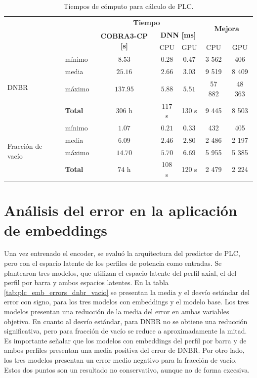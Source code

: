 \begin{table}[H]
	\centering
	\caption{Tiempos de cómputo para cálculo de PLC.}
	\begin{tabular}{l l c c c c c} 
        \toprule
        & & \multicolumn{3}{c}{\textbf{Tiempo}} & \multicolumn{2}{c}{\multirow{2}{*}{\textbf{Mejora}}} \\
        & & \multirow{2}{*}{\textbf{COBRA3-CP [s]}} & \multicolumn{2}{c}{\textbf{DNN [ms]}} &  \\
        & &                                     & CPU & GPU & CPU & GPU \\
        \hline
        \multirow{4}{1.5cm}{DNBR}   
                                & mínimo        & $8.53$      & $0.28$  & $0.47$ & 3 562   & 406 \\
                                & media         & $25.16$     & $2.66$  & $3.03$ & 9 519   & 8 409\\
                                & máximo        & $137.95$    & $5.88$  & $5.51$ & 57 882 & 48 363\\
                                & \textbf{Total}& 306 h     & 117 s & 130 s& 9 445  & 8 503\\
        \hline
        \multirow{4}{1.5cm}{Fracción de vacío}  
                                & mínimo        & $1.07$      & $0.21$  & $0.33$  & 432   & 405\\
                                & media         & $6.09$      & $2.46$  & $2.80$  & 2 486  & 2 197\\
                                & máximo        & $14.70$     & $5.70$  & $6.69$  & 5 955  & 5 385\\
                                & \textbf{Total}& 74 h     & 108 s & 120 s & 2 479  & 2 224\\
		\bottomrule
	\end{tabular}
	\label{tab:plc_tiempos}
\end{table}


\section{Análisis del error en la aplicación de embeddings}
\label{app_plc_emb_errores}
Una vez entrenado el encoder, se evaluó la arquitectura del predictor de PLC, pero con el espacio latente de los perfiles de potencia como entradas. Se plantearon tres modelos, que utilizan el espacio latente del perfil axial, el del perfil por barra y ambos espacios latentes. En la tabla \ref{tab:plc_emb_errors_dnbr_vacio} se presentan la media y el desvío estándar del error con signo, para los tres modelos con embeddings y el modelo base. Los tres modelos presentan una reducción de la media del error en ambas variables objetivo. En cuanto al desvío estándar, para DNBR no se obtiene una reducción significativa, pero para fracción de vacío se reduce a aproximadamente la mitad. Es importante señalar que los modelos con embeddings del perfil por barra y de ambos perfiles presentan una media positiva del error de DNBR. Por otro lado, los tres modelos presentan un error medio negativo para la fracción de vacío. Estos dos puntos son un resultado no conservativo, aunque no de forma excesiva.

